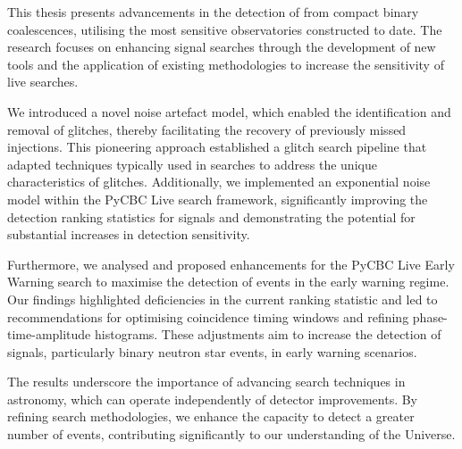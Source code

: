 This thesis presents advancements in the detection of \gws from compact binary coalescences, utilising the most sensitive observatories constructed to date. The research focuses on enhancing \gwadj signal searches through the development of new tools and the application of existing methodologies to increase the sensitivity of live \gwadj searches. 

We introduced a novel noise artefact model, which enabled the identification and removal of glitches, thereby facilitating the recovery of previously missed \gwadj injections. This pioneering approach established a glitch search pipeline that adapted techniques typically used in \gwadj searches to address the unique characteristics of glitches. Additionally, we implemented an exponential noise model within the PyCBC Live search framework, significantly improving the detection ranking statistics for \gwadj signals and demonstrating the potential for substantial increases in detection sensitivity.

Furthermore, we analysed and proposed enhancements for the PyCBC Live Early Warning search to maximise the detection of \gwadj events in the early warning regime. Our findings highlighted deficiencies in the current ranking statistic and led to recommendations for optimising coincidence timing windows and refining phase-time-amplitude histograms. These adjustments aim to increase the detection of \gwadj signals, particularly binary neutron star events, in early warning scenarios.

The results underscore the importance of advancing search techniques in \gwadj astronomy, which can operate independently of detector improvements. By refining search methodologies, we enhance the capacity to detect a greater number of events, contributing significantly to our understanding of the Universe.
